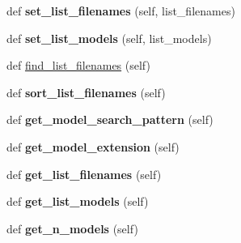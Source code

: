 \begin{DoxyCompactItemize}
def {\bfseries set\+\_\+list\+\_\+filenames} (self, list\+\_\+filenames)
\item 
\mbox{\label{classasamba_1_1var__def_1_1models_af251a31d212a3f448a482d7f455e4efe}} 
def {\bfseries set\+\_\+list\+\_\+models} (self, list\+\_\+models)
\item 
def \hyperlink{classasamba_1_1var__def_1_1models_ae0babd86feff61275e38952a7cc23282}{find\+\_\+list\+\_\+filenames} (self)
\item 
\mbox{\label{classasamba_1_1var__def_1_1models_a803340c120565c5c7efc4caf0eab9785}} 
def {\bfseries sort\+\_\+list\+\_\+filenames} (self)
\item 
\mbox{\label{classasamba_1_1var__def_1_1models_ae7c4bf74c3b026d2b02afd17a0d8958e}} 
def {\bfseries get\+\_\+model\+\_\+search\+\_\+pattern} (self)
\item 
\mbox{\label{classasamba_1_1var__def_1_1models_acd68787862f1bc189b591cdc7b1f8317}} 
def {\bfseries get\+\_\+model\+\_\+extension} (self)
\item 
\mbox{\label{classasamba_1_1var__def_1_1models_af2265e679ad70a301f49597023f74af1}} 
def {\bfseries get\+\_\+list\+\_\+filenames} (self)
\item 
\mbox{\label{classasamba_1_1var__def_1_1models_a0d42ee8bfa9d99a37768e31f843f5a9f}} 
def {\bfseries get\+\_\+list\+\_\+models} (self)
\item 
\mbox{\label{classasamba_1_1var__def_1_1models_a610f2b866ecb89f6541e30c461e825bd}} 
def {\bfseries get\+\_\+n\+\_\+models} (self)
\end{DoxyCompactItemize}
